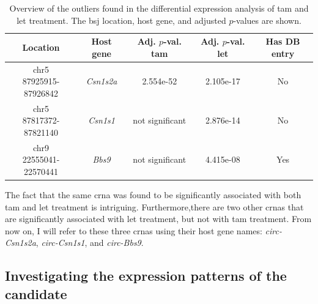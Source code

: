 \begin{table}[H] \centering \begin{tabular}{|c|c|c|c|c|} \hline Location &
               Host gene
                                             & \makecell{Adj. $p$-val. \\
               \gls{tam}}
                                             &
               \makecell{Adj. $p$-val.                                 \\
               \gls{let}}                    & Has DB entry
               \\ \hline \hline
               \makecell{chr5
               \\87925915-87926842} & \textit{Csn1s2a}
                                             &
                 2.554e-52
                                             & 2.105e-17
                                             & No
               \\ \hline
               \makecell{chr5
               \\87817372-87821140} & \textit{Csn1s1}
                                             & not
               significant                   & 2.876e-14
                                             & No
               \\ \hline
               \makecell{chr9
               \\22555041-22570441} & \textit{Bbs9}
                                             & not
               significant                   & 4.415e-08
                                             & Yes
               \\ \hline
    \end{tabular} \caption{Overview of the outliers found in the differential
        expression analysis of \gls{tam} and \gls{let} treatment.
        The \gls{bsj} location, host gene, and adjusted $p$-values are shown.
    }
    \label{tab:outliers}
\end{table}

The fact that the same \gls{crna} was found to be significantly associated with
both \gls{tam} and \gls{let} treatment is intriguing.
Furthermore,there are two other \glspl{crna} that are significantly associated
with \gls{let} treatment, but not with \gls{tam} treatment.
From now on, I will refer to these three \glspl{crna} using their host gene
names: \textit{circ-Csn1s2a}, \textit{circ-Csn1s1}, and \textit{circ-Bbs9}.

\subsection{Investigating the expression patterns of the candidate
    }


